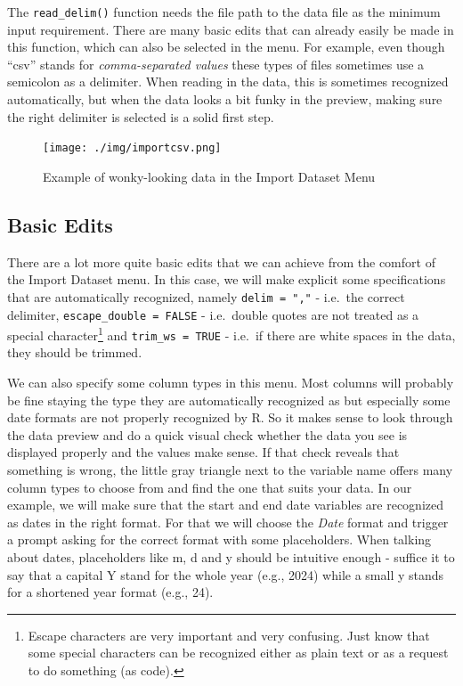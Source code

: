 \documentclass[
]{book}
\begin{document}
The \texttt{read\_delim()} function needs the file path to the data file as the minimum input requirement.
There are many basic edits that can already easily be made in this function, which can also be selected in the menu.
For example, even though ``csv'' stands for \emph{comma-separated values} these types of files sometimes use a semicolon as a delimiter.
When reading in the data, this is sometimes recognized automatically, but when the data looks a bit funky in the preview, making sure the right delimiter is selected is a solid first step.

\begin{figure}
\centering
\texttt{[image: ./img/importcsv.png]}
\caption{Example of wonky-looking data in the Import Dataset Menu}
\end{figure}

\subsection*{\texorpdfstring{Basic Edits }{Basic Edits }}\label{basic-edits}

There are a lot more quite basic edits that we can achieve from the comfort of the Import Dataset menu.
In this case, we will make explicit some specifications that are automatically recognized, namely \texttt{delim\ =\ ","} - i.e.~the correct delimiter, \texttt{escape\_double\ =\ FALSE} - i.e.~double quotes are not treated as a special character\footnote{Escape characters are very important and very confusing. Just know that some special characters can be recognized either as plain text or as a request to do something (as code).} and \texttt{trim\_ws\ =\ TRUE} - i.e.~if there are white spaces in the data, they should be trimmed.

We can also specify some column types in this menu.
Most columns will probably be fine staying the type they are automatically recognized as but especially some date formats are not properly recognized by R.
So it makes sense to look through the data preview and do a quick visual check whether the data you see is displayed properly and the values make sense.
If that check reveals that something is wrong, the little gray triangle next to the variable name offers many column types to choose from and find the one that suits your data.
In our example, we will make sure that the start and end date variables are recognized as dates in the right format.
For that we will choose the \emph{Date} format and trigger a prompt asking for the correct format with some placeholders.
When talking about dates, placeholders like m, d and y should be intuitive enough - suffice it to say that a capital Y stand for the whole year (e.g., 2024) while a small y stands for a shortened year format (e.g., 24).
\end{document}
